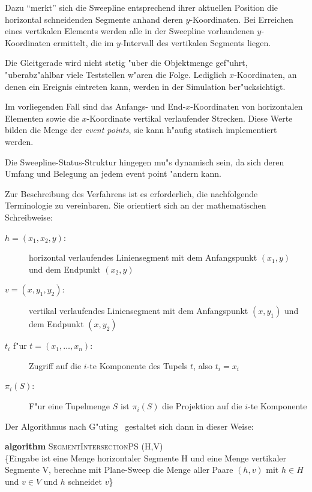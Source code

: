 \documentclass[draft,12pt]{scrreprt}
\theoremstyle{break}
\begin{document}
Dazu "`merkt"' sich die Sweepline entsprechend ihrer aktuellen
Position die horizontal schneidenden Segmente anhand deren
$y$-Koordinaten. Bei Erreichen eines vertikalen Elements
werden alle in der Sweepline vorhandenen $y$-Koordinaten
ermittelt, die im $y$-Intervall des vertikalen Segments
liegen.

Die Gleitgerade wird nicht stetig "uber die Objektmenge
gef"uhrt, "uberabz"ahlbar viele Teststellen w"aren die Folge. 
Lediglich $x$-Koordinaten, an denen ein Ereignis
eintreten kann, werden in der Simulation ber"ucksichtigt.

Im vorliegenden Fall sind das Anfangs- und End-$x$-Koordinaten von
horizontalen Elementen sowie die $x$-Koordinate 
vertikal verlaufender Strecken. Diese Werte bilden die Menge
der \textit{event points}, sie kann h"aufig statisch implementiert werden.

Die Sweepline-Status-Struktur hingegen mu"s dynamisch sein, da sich
deren Umfang und Belegung an jedem event point "andern kann.

Zur Beschreibung des Verfahrens ist es erforderlich, die nachfolgende
Terminologie zu vereinbaren. Sie orientiert sich an der mathematischen
Schreibweise:

\begin{description}

\item[$h=(x_1,x_2,y)$:] horizontal verlaufendes Liniensegment mit dem
    Anfangspunkt $(x_1,y)$ und dem Endpunkt $(x_2,y)$
\item[$v=(x,y_1,y_2)$:] vertikal verlaufendes Liniensegment mit dem
    Anfangspunkt $(x,y_1)$ und dem Endpunkt $(x,y_2)$
\item[$t_i$ f"ur $t=(x_1,\dots,x_n)$:] Zugriff auf die $i$-te Komponente des 
   Tupels $t$, also $t_i=x_i$
\item[$\pi_i(S)$:] F"ur eine Tupelmenge $S$ ist $\pi_i(S)$ die Projektion
   auf die $i$-te Komponente
\end{description} 

Der Algorithmus nach G"uting~\cite{guting} gestaltet sich dann in dieser Weise:

\textbf{algorithm} \textsc{SegmentIntersectionPS (H,V)}\\
\{Eingabe ist eine Menge horizontaler Segmente H und eine Menge vertikaler
 Segmente V, berechne mit Plane-Sweep die Menge aller Paare $(h,v)$
mit $h{\in}H$ und $v{\in}V$ und $h$ schneidet $v$\}
\end{document}
